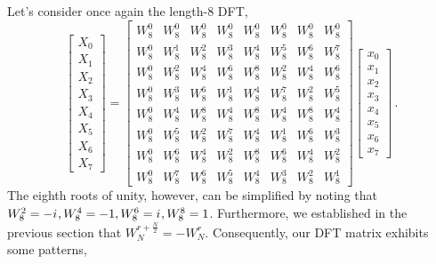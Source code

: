 Let's consider once again the length-8 DFT,
%
\begin{displaymath}
  \left[\begin{array}{c}
      X_0 \\ X_1 \\ X_2 \\ X_3 \\ X_4 \\ X_5 \\ X_6 \\ X_7
    \end{array}\right] =
  \left[\begin{array}{cccccccc}
      W_8^0 & W_8^0 & W_8^0 & W_8^0 & W_8^0 & W_8^0 & W_8^0 & W_8^0 \\
      W_8^0 & W_8^1 & W_8^2 & W_8^3 & W_8^4 & W_8^5 & W_8^6 & W_8^7 \\
      W_8^0 & W_8^2 & W_8^4 & W_8^6 & W_8^8 & W_8^2 & W_8^4 & W_8^6 \\
      W_8^0 & W_8^3 & W_8^6 & W_8^1 & W_8^4 & W_8^7 & W_8^2 & W_8^5 \\
      W_8^0 & W_8^4 & W_8^8 & W_8^4 & W_8^8 & W_8^4 & W_8^8 & W_8^4 \\
      W_8^0 & W_8^5 & W_8^2 & W_8^7 & W_8^4 & W_8^1 & W_8^6 & W_8^3 \\
      W_8^0 & W_8^6 & W_8^4 & W_8^2 & W_8^8 & W_8^6 & W_8^4 & W_8^2 \\
      W_8^0 & W_8^7 & W_8^6 & W_8^5 & W_8^4 & W_8^3 & W_8^2 & W_8^1      
    \end{array}\right]
  \left[\begin{array}{c}
      x_0 \\ x_1 \\ x_2 \\ x_3 \\ x_4 \\ x_5 \\ x_6 \\ x_7
    \end{array}\right] \,.
\end{displaymath}
%
The eighth roots of unity, however, can be simplified by noting that
$W_8^2 = -{i\mkern1mu}, W_8^4 = -1, W_8^6 = {i\mkern1mu}, W_8^8 = 1$. Furthermore, we
established in the previous section that $W_N^{r+\frac{N}{2}} = -W_N^r$.
Consequently, our DFT matrix exhibits some patterns,
%
